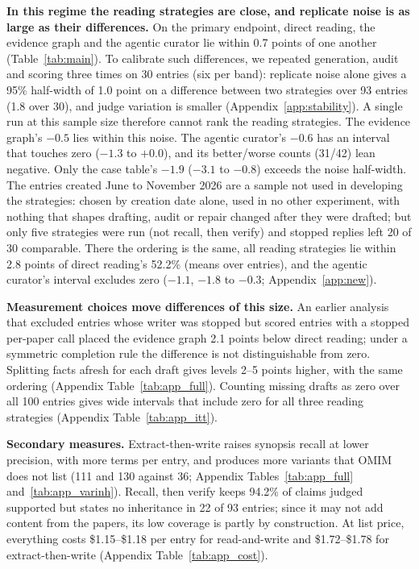 \documentclass{article} %
\begin{document}
\textbf{In this regime the reading strategies are close, and replicate noise is as large as their differences.} On the primary endpoint, direct reading, the evidence graph and the agentic curator lie within 0.7 points of one another (Table~\ref{tab:main}). To calibrate such differences, we repeated generation, audit and scoring three times on 30 entries (six per band): replicate noise alone gives a 95\% half-width of 1.0 point on a difference between two strategies over 93 entries (1.8 over 30), and judge variation is smaller (Appendix~\ref{app:stability}). A single run at this sample size therefore cannot rank the reading strategies. The evidence graph's $-0.5$ lies within this noise. The agentic curator's $-0.6$ has an interval that touches zero ($-1.3$ to $+0.0$), and its better/worse counts (31/42) lean negative. Only the case table's $-1.9$ ($-3.1$ to $-0.8$) exceeds the noise half-width. The entries created June to November 2026 are a sample not used in developing the strategies: chosen by creation date alone, used in no other experiment, with nothing that shapes drafting, audit or repair changed after they were drafted; but only five strategies were run (not recall, then verify) and stopped replies left 20 of 30 comparable. There the ordering is the same, all reading strategies lie within 2.8 points of direct reading's 52.2\% (means over entries), and the agentic curator's interval excludes zero ($-1.1$, $-1.8$ to $-0.3$; Appendix~\ref{app:new}).

\textbf{Measurement choices move differences of this size.} An earlier analysis that excluded entries whose writer was stopped but scored entries with a stopped per-paper call placed the evidence graph 2.1 points below direct reading; under a symmetric completion rule the difference is not distinguishable from zero. Splitting facts afresh for each draft gives levels 2--5 points higher, with the same ordering (Appendix Table~\ref{tab:app_full}). Counting missing drafts as zero over all 100 entries gives wide intervals that include zero for all three reading strategies (Appendix Table~\ref{tab:app_itt}).

\textbf{Secondary measures.} Extract-then-write raises synopsis recall at lower precision, with more terms per entry, and produces more variants that OMIM does not list (111 and 130 against 36; Appendix Tables~\ref{tab:app_full} and~\ref{tab:app_varinh}). Recall, then verify keeps 94.2\% of claims judged supported but states no inheritance in 22 of 93 entries; since it may not add content from the papers, its low coverage is partly by construction. At list price, everything costs \$1.15--\$1.18 per entry for read-and-write and \$1.72--\$1.78 for extract-then-write (Appendix Table~\ref{tab:app_cost}).
\end{document}
